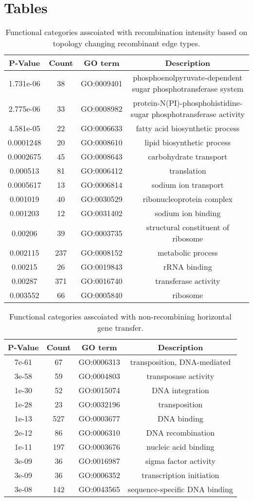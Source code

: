 \documentclass[english]{article}
\providecommand{\tabularnewline}{\\}
\begin{document}
\clearpage{}


\section*{Tables}

\clearpage{}

\begin{table}
\caption{\label{tab:functional}Functional categories asscoiated with 
recombination intensity based on topology changing recombinant edge types.}
\begin{tabular}{cccc}
\hline 
P-Value & Count & GO term & Description\tabularnewline
\hline 
1.731e-06 & 38 & GO:0009401 & phosphoenolpyruvate-dependent sugar phosphotransferase system\tabularnewline
2.775e-06 & 33 & GO:0008982 & protein-N(PI)-phosphohistidine-sugar phosphotransferase activity\tabularnewline
4.581e-05 & 22 & GO:0006633 & fatty acid biosynthetic process\tabularnewline
0.0001248 & 20 & GO:0008610 & lipid biosynthetic process\tabularnewline
0.0002675 & 45 & GO:0008643 & carbohydrate transport\tabularnewline
0.000513 & 81 & GO:0006412 & translation\tabularnewline
0.0005617 & 13 & GO:0006814 & sodium ion transport\tabularnewline
0.001019 & 40 & GO:0030529 & ribonucleoprotein complex\tabularnewline
0.001203 & 12 & GO:0031402 & sodium ion binding\tabularnewline
0.00206 & 39 & GO:0003735 & structural constituent of ribosome\tabularnewline
0.002115 & 237 & GO:0008152 & metabolic process\tabularnewline
0.00215 & 26 & GO:0019843 & rRNA binding\tabularnewline
0.00287 & 371 & GO:0016740 & transferase activity\tabularnewline
0.003552 & 66 & GO:0005840 & ribosome\tabularnewline
\hline 
\end{tabular}
\end{table}
\clearpage{}


%
\begin{table}
\caption{\label{tab:go-events}Functional categories asscoiated with 
non-recombining horizontal gene transfer.}
\begin{tabular}{cccc}
\hline 
P-Value & Count & GO term & Description \\
\hline 
7e-61 &  67 & GO:0006313 & transposition, DNA-mediated\\
3e-58 &  59 & GO:0004803 & transposase activity\\
1e-30 &  52 & GO:0015074 & DNA integration\\
1e-28 &  23 & GO:0032196 & transposition\\
1e-13 & 527 & GO:0003677 & DNA binding\\
2e-12 &  86 & GO:0006310 & DNA recombination\\
1e-11 & 197 & GO:0003676 & nucleic acid binding\\
3e-09 &  36 & GO:0016987 & sigma factor activity\\
3e-09 &  36 & GO:0006352 & transcription initiation\\
3e-08 & 142 & GO:0043565 & sequence-specific DNA binding\\
\hline 
\end{tabular}
\end{table}
\clearpage{}
\end{document}
